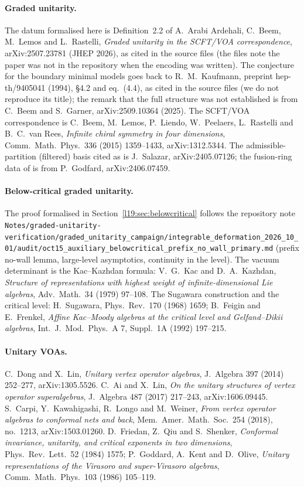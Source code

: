 \paragraph{Graded unitarity.} The datum formalised here is Definition~2.2 of A.~Arabi Ardehali, C.~Beem,
M.~Lemos and L.~Rastelli, \emph{Graded unitarity in the SCFT/VOA correspondence}, arXiv:2507.23781 (JHEP 2026),
as cited in the source files (the files note the paper was not in the repository when the encoding was written).
The conjecture for the boundary minimal models goes back to R.~M.~Kaufmann, preprint hep-th/9405041 (1994),
\S4.2 and eq.~(4.4), as cited in the source files (we do not reproduce its title); the remark that the full structure was not established is from C.~Beem and S.~Garner, arXiv:2509.10364 (2025). The
SCFT/VOA correspondence is C.~Beem, M.~Lemos, P.~Liendo, W.~Peelaers, L.~Rastelli and B.~C.~van Rees,
\emph{Infinite chiral symmetry in four dimensions}, Comm.\ Math.\ Phys.\ 336 (2015) 1359--1433, arXiv:1312.5344. The
admissible-partition (filtered) basis cited as  is J.~Salazar, arXiv:2405.07126; the fusion-ring
data of  is from P.~Godfard, arXiv:2406.07459.

\paragraph{Below-critical graded unitarity.} The proof formalised in Section~\ref{l19:sec:belowcritical} follows the
repository note
\texttt{Notes/\allowbreak graded-unitarity-verification/\allowbreak graded\_unitarity\_campaign/\allowbreak integrable\_deformation\_2026\_10\_01/\allowbreak audit/\allowbreak oct15\_auxiliary\_belowcritical\_prefix\_no\_wall\_primary.md}
(prefix no-wall lemma, large-level asymptotics, continuity in the level). The vacuum determinant is the
Kac--Kazhdan formula: V.~G.~Kac and D.~A.~Kazhdan, \emph{Structure of representations with highest weight of infinite-dimensional
Lie algebras}, Adv.\ Math.\ 34 (1979) 97--108. The Sugawara construction and the critical level: H.~Sugawara, Phys.\ Rev.\ 170
(1968) 1659; B.~Feigin and E.~Frenkel, \emph{Affine Kac--Moody algebras at the critical level and Gelfand--Dikii algebras},
Int.\ J.\ Mod.\ Phys.\ A 7, Suppl.\ 1A (1992) 197--215.

\paragraph{Unitary VOAs.} C.~Dong and X.~Lin, \emph{Unitary vertex operator algebras}, J.\ Algebra 397 (2014)
252--277, arXiv:1305.5526. C.~Ai and X.~Lin, \emph{On the unitary structures of vertex operator superalgebras},
J.\ Algebra 487 (2017) 217--243, arXiv:1606.09445. S.~Carpi, Y.~Kawahigashi, R.~Longo and M.~Weiner, \emph{From vertex
operator algebras to conformal nets and back}, Mem.\ Amer.\ Math.\ Soc.\ 254 (2018), no.~1213, arXiv:1503.01260.
D.~Friedan, Z.~Qiu and S.~Shenker, \emph{Conformal invariance, unitarity, and critical exponents in two dimensions},
Phys.\ Rev.\ Lett.\ 52 (1984) 1575; P.~Goddard, A.~Kent and D.~Olive, \emph{Unitary representations of the Virasoro and
super-Virasoro algebras}, Comm.\ Math.\ Phys.\ 103 (1986) 105--119.

